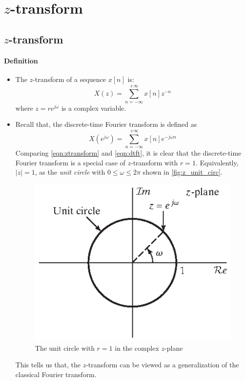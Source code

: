 \section{$z$-transform}
\subsection{$z$-transform}
\paragraph{Definition}
\begin{itemize}
    \item The $z$-transform of a sequence $x[n]$ is:
        \begin{equation} \label{eqn:ztransform}
            X(z) = \sum_{n=-\infty}^{+\infty} x[n] z^{-n}
        \end{equation}
        where $z = re^{j\omega}$ is a complex variable.

    \item Recall that, the discrete-time Fourier transform is defined as
        \begin{equation} \label{eqn:dtft}
            X(e^{j\omega}) = \sum_{n=-\infty}^{+\infty} x[n] e^{-j\omega n}
        \end{equation}
    Comparing \autoref{eqn:ztransform} and \autoref{eqn:dtft}, it is clear that the discrete-time Fourier transform is a special case of $z$-transform with $r=1$. Equivalently, $\lvert z \rvert = 1$, as the \textit{unit circle} with $0 \leq \omega \leq 2\pi $ shown in \autoref{fig:z_unit_circ}.
    \begin{figure}[H]
        \centering
        \includegraphics{images/z_plane.eps}
        \caption{The unit circle with $r=1$ in the complex $z$-plane}
        \label{fig:z_unit_circ}
    \end{figure}
    This tells us that, the $z$-transform can be viewed as a generalization of the classical Fourier transform.
\end{itemize}

